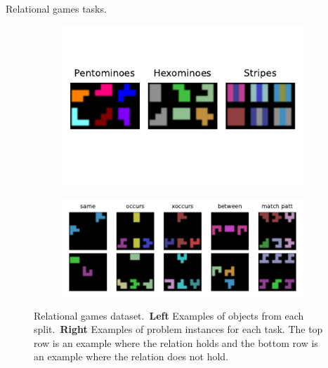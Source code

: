 \begin{table}[ht]
    \centering
    
    \caption{Relational games tasks.}
    \label{tab:relational_games_tasks}
\end{table}

\begin{figure}
    \centering
    \begin{subfigure}[t]{0.37\textwidth}
        \centering
        \includegraphics[width=\textwidth]{figs/relational_games_objects.pdf}
        \label{fig:relational_games_objects}
    \end{subfigure}
    \begin{subfigure}[t]{0.62\textwidth}
        \centering
        \includegraphics[width=\textwidth]{figs/relational_games_tasks.pdf}
        \label{fig:relational_games_tasks}
    \end{subfigure}
    \caption{Relational games dataset.~\textbf{Left} Examples of objects from each split.~\textbf{Right} Examples of problem instances for each task. The top row is an example where the relation holds and the bottom row is an example where the relation does not hold.}
    \label{fig:relational_games_dataset}
\end{figure}


